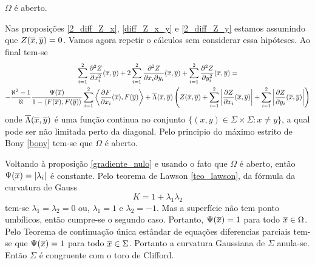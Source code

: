 \begin{proposicao}
	$\Omega$ é aberto.
\end{proposicao}

\begin{demonstracao}
	Nas proposições \eqref{2_diff_Z_x}, \eqref{diff_Z_x_y} e \eqref{2_diff_Z_y} estamos assumindo que $Z(\overline{x},\overline{y}) = 0$. Vamos agora repetir o cálculos sem considerar essa hipóteses. Ao final tem-se
	\begin{multline*}
	\sum_{i=1}^2 \frac{\partial^2 Z}{\partial x_i^2}(\overline{x},\overline{y}) + 2 \sum_{i=1}^2 \frac{\partial^2 Z}{\partial x_i \partial y_i}(\overline{x},\overline{y}) + \sum_{i=1}^2 \frac{\partial^2 Z}{\partial y_i^2}(\overline{x},\overline{y}) =\\
	- \frac{\aleph^2 - 1}{\aleph} \frac{\Psi(\overline{x})}{1 - \langle F(\overline{x}), F(\overline{y}) \rangle} \sum_{i=1}^2 \left\langle \frac{\partial F}{\partial x_i}(\overline{x}), F(\overline{y}) \right\rangle + \overline{\Lambda}(\overline{x},\overline{y}) \left( Z(\overline{x},\overline{y}) + \sum_{i=1}^2 \left| \frac{\partial Z}{\partial x_i}(\overline{x},\overline{y}) \right| + \sum_{i=1}^2 \left| \frac{\partial Z}{\partial y_i}(\overline{x},\overline{y}) \right| \right)
	\end{multline*}
	onde $\overline{\Lambda}(\overline{x},\overline{y})$ é uma função continua no conjunto $\{ (x,y) \in \Sigma \times \Sigma: x \neq y \}$, a qual pode ser não limitada perto da diagonal.	
	Pelo principio do máximo estrito de Bony \ref{bony} tem-se que $\Omega$ é aberto.
\end{demonstracao}

Voltando à proposição \ref{gradiente_nulo} e usando o fato que $\Omega$ é aberto, então $\Psi(\overline{x})= |\lambda_i|$ é constante. Pelo teorema de Lawson \ref{teo_lawson}, da fórmula da curvatura de Gauss
\begin{equation*}
	K = 1 + \lambda_1 \lambda_2
\end{equation*}
tem-se $\lambda_1 = \lambda_2 = 0$ ou, $\lambda_1 = 1$ e $\lambda_2=-1$. Mas a superfície não tem ponto umbílicos, então cumpre-se o segundo caso. Portanto, $\Psi(\overline{x})=1$ para todo $\overline{x} \in \Omega$.	
Pelo Teorema de continuação única estândar de equações diferencias parciais \cite{Aronszajn1957} tem-se que $\Psi(\overline{x}) = 1$ para todo $\overline{x} \in \Sigma$. Portanto a curvatura Gaussiana de $\Sigma$ anula-se. Então $\Sigma$ é congruente com o toro de Clifford.